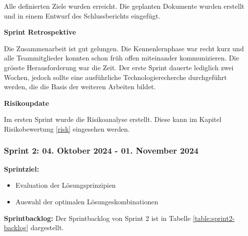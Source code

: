 Alle definierten Ziele wurden erreicht. Die geplanten Dokumente wurden erstellt und in einem Entwurf des Schlussberichts eingefügt.

\textbf{Sprint Retrospektive}

Die Zusammenarbeit ist gut gelungen. Die Kennenlernphase war recht kurz und alle Teammitglieder konnten schon früh offen miteinander kommunizieren. Die grösste Herausforderung war die Zeit. Der erste Sprint dauerte lediglich zwei Wochen, jedoch sollte eine ausführliche Technologierecherche durchgeführt werden, die die Basis der weiteren Arbeiten bildet.

\textbf{Risikoupdate}

Im ersten Sprint wurde die Risikoanalyse erstellt. Diese kann im Kapitel Risikobewertung \ref{risk} eingesehen werden.

\newpage
\subsubsection{Sprint 2: 04. Oktober 2024 - 01. November 2024}

\textbf{Sprintziel:}
\begin{itemize}
    \item Evaluation der Lösungsprinzipien
    \item Auswahl der optimalen Lösungeskombinationen
\end{itemize}

\textbf{Sprintbacklog:} Der Sprintbacklog von Sprint 2 ist in Tabelle \ref{table:sprint2-backlog} dargestellt.


